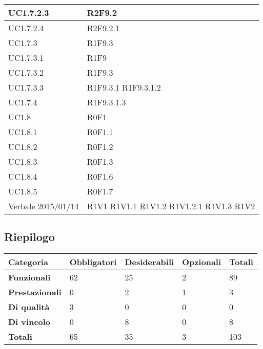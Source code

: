 \begin{center}
\begin{longtable}{| p{4cm} | p{4cm} |}
		\hline
		UC1.7.2.3  &  R2F9.2 \\
		\hline
		UC1.7.2.4  &  R2F9.2.1 \\
		\hline
		UC1.7.3  &  R1F9.3 \\
		\hline
		UC1.7.3.1  &  R1F9 \\
		\hline
		UC1.7.3.2  &  R1F9.3 \\
		\hline
		UC1.7.3.3  &  R1F9.3.1 \newline R1F9.3.1.2 \\
		\hline
		UC1.7.4  &  R1F9.3.1.3 \\
		\hline
		UC1.8  &  R0F1 \\
		\hline
		UC1.8.1  &  R0F1.1 \\
		\hline
		UC1.8.2  &  R0F1.2 \\
		\hline
		UC1.8.3  &  R0F1.3 \\
		\hline
		UC1.8.4  &  R0F1.6 \\
		\hline
		UC1.8.5  &  R0F1.7 \\
		\hline
		Verbale 2015/01/14  &  R1V1 \newline R1V1.1 \newline R1V1.2 \newline R1V1.2.1 \newline R1V1.3 \newline R1V2 \\
		\hline

	\end{longtable}
	\egroup
	\end{center}


\subsection{Riepilogo}

\begin{center}

	\def\arraystretch{1.5}
	\bgroup
	\begin{longtable}{| p{2.7cm} | p{2.4cm} | p{2.4cm} | p{2.4cm} | p{1.7cm} |}

		\hline
		\textbf{Categoria} & \textbf{Obbligatori} & \textbf{Desiderabili} & \textbf{Opzionali} & \textbf{Totali} \\
		\hline

		\textbf{Funzionali}  & 62 & 25 & 2 & 89\\
		\hline
		\textbf{Prestazionali} & 0 & 2 & 1 & 3\\
		\hline
		\textbf{Di qualità} & 3 & 0 & 0 & 0\\
		\hline
		\textbf{Di vincolo} & 0 & 8 & 0 & 8\\
		\hline
		\textbf{Totali}  & 65 & 35 & 3 & 103\\
		\hline
	\end{longtable}
	\egroup
\end{center}



